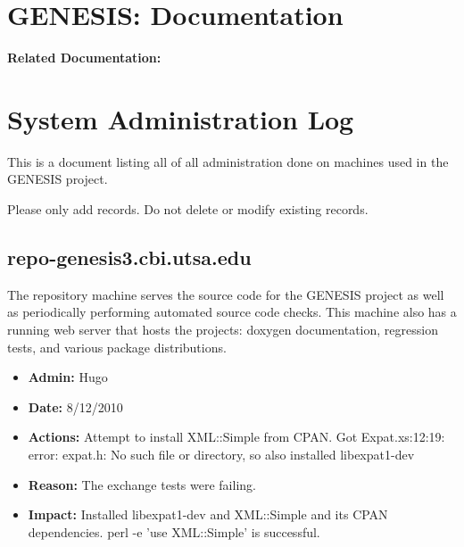 \documentclass[12pt]{article}
\begin{document}
\section*{GENESIS: Documentation}

{\bf Related Documentation:}

\section*{System Administration Log}

This is a document listing all of all administration done on machines
used in the GENESIS project.

Please only add records.  Do not delete or modify existing records.


\subsection*{repo-genesis3.cbi.utsa.edu}

The repository machine serves the source code for the GENESIS project as well as periodically performing automated source code checks. This machine also has a running web server that hosts the projects: doxygen documentation, regression tests, and various package distributions.


\begin{itemize}
\item[] {\bf Admin:} Hugo
\item[] {\bf Date:} 8/12/2010 
\item[] {\bf Actions:} Attempt to install XML::Simple from CPAN.
Got Expat.xs:12:19: error: expat.h: No such file or directory, so also installed libexpat1-dev

\item[] {\bf Reason:} The exchange tests were failing.
\item[] {\bf Impact:} Installed libexpat1-dev and XML::Simple and its
  CPAN dependencies.  perl -e 'use XML::Simple' is successful.
\end{itemize}
\end{document}

